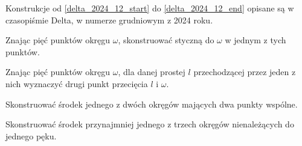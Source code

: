 Konstrukcje od \ref{delta_2024_12_start} do \ref{delta_2024_12_end} opisane są w czasopiśmie Delta, w numerze grudniowym z 2024 roku.

\begin{geoconstruction}
    \label{delta_2024_12_start}
    Znając pięć punktów okręgu $\omega$, skonstruować styczną do $\omega$ w jednym z tych punktów.
\end{geoconstruction}

\begin{geoconstruction}
    Znając pięć punktów okręgu $\omega$, dla danej prostej $l$ przechodzącej przez jeden z nich wyznaczyć drugi punkt przecięcia $l$ i $\omega$.
\end{geoconstruction}

\begin{geoconstruction}
    Skonstruować środek jednego z dwóch okręgów mających dwa punkty wspólne.
\end{geoconstruction}

\begin{geoconstruction}
    \label{delta_2024_12_end}
    Skonstruować środek przynajmniej jednego z trzech okręgów nienależących do jednego pęku.
\end{geoconstruction}